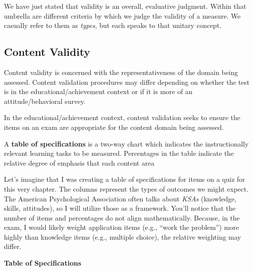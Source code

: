 \documentclass[
  english,
]{book}
\begin{document}
We have just stated that validity is an overall, evaluative judgment. Within that umbrella are different criteria by which we judge the validity of a measure. We casually refer to them as \emph{types}, but each speaks to that unitary concept.

\hypertarget{content-validity}{%
\subsection{Content Validity}\label{content-validity}}

Content validity is concerned with the representativeness of the domain being assessed. Content validation procedures may differ depending on whether the test is in the educational/achievement context or if it is more of an attitude/behavioral survey.

In the educational/achievement context, content validation seeks to ensure the items on an exam are appropriate for the content domain being assessed.

A \textbf{table of specifications} is a two-way chart which indicates the instructionally relevant learning tasks to be measured. Percentages in the table indicate the relative degree of emphasis that each content area

Let's imagine that I was creating a table of specifications for items on a quiz for this very chapter. The columns represent the types of outcomes we might expect. The American Psychological Association often talks about \emph{KSAs} (knowledge, skills, attitudes), so I will utilize those as a framework. You'll notice that the number of items and percentages do not align mathematically. Because, in the exam, I would likely weight application items (e.g., ``work the problem'') more highly than knowledge items (e.g., multiple choice), the relative weighting may differ.

\textbf{Table of Specifications}
\end{document}
